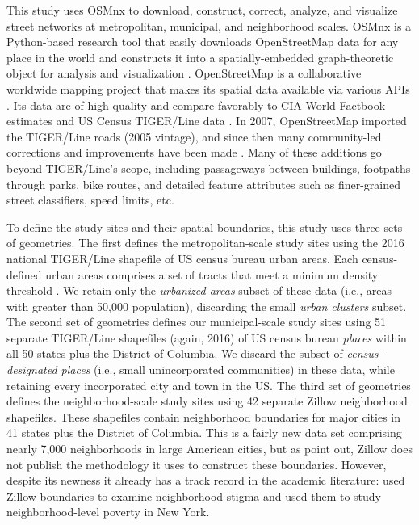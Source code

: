 \documentclass{article}
\begin{document}
This study uses OSMnx to download, construct, correct, analyze, and visualize street networks at metropolitan, municipal, and neighborhood scales. OSMnx is a Python-based research tool that easily downloads OpenStreetMap data for any place in the world and constructs it into a spatially-embedded graph-theoretic object for analysis and visualization \cite{boeing_osmnx:_2017}. OpenStreetMap is a collaborative worldwide mapping project that makes its spatial data available via various APIs \cite{corcoran_analysing_2013, jokar_arsanjani_openstreetmap_2015}. Its data are of high quality and compare favorably to CIA World Factbook estimates and US Census TIGER/Line data \cite{haklay_how_2010, over_generating_2010, zielstra_comparative_2011, maron_how_2015, wu_improving_2005, frizzelle_importance_2009}. In 2007, OpenStreetMap imported the TIGER/Line roads (2005 vintage), and since then many community-led corrections and improvements have been made \cite{willis_openstreetmap_2008}. Many of these additions go beyond TIGER/Line's scope, including passageways between buildings, footpaths through parks, bike routes, and detailed feature attributes such as finer-grained street classifiers, speed limits, etc.

To define the study sites and their spatial boundaries, this study uses three sets of geometries. The first defines the metropolitan-scale study sites using the 2016 national TIGER/Line shapefile of US census bureau urban areas. Each census-defined urban areas comprises a set of tracts that meet a minimum density threshold \cite{u.s._census_bureau_2010_2010}. We retain only the \emph{urbanized areas} subset of these data (i.e., areas with greater than 50,000 population), discarding the small \emph{urban clusters} subset. The second set of geometries defines our municipal-scale study sites using 51 separate TIGER/Line shapefiles (again, 2016) of US census bureau \emph{places} within all 50 states plus the District of Columbia. We discard the subset of \emph{census-designated places} (i.e., small unincorporated communities) in these data, while retaining every incorporated city and town in the US. The third set of geometries defines the neighborhood-scale study sites using 42 separate Zillow neighborhood shapefiles. These shapefiles contain neighborhood boundaries for major cities in 41 states plus the District of Columbia. This is a fairly new data set comprising nearly 7,000 neighborhoods in large American cities, but as \citet{schernthanner_spatial_2016} point out, Zillow does not publish the methodology it uses to construct these boundaries. However, despite its newness it already has a track record in the academic literature: \citet{besbris_effect_2015} used Zillow boundaries to examine neighborhood stigma and \citet{albrecht_indicator_2014} used them to study neighborhood-level poverty in New York.
\end{document}
